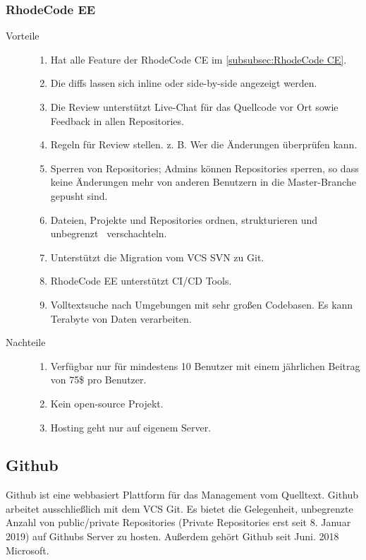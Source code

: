 \subsubsection{RhodeCode EE}
\label{subsubsec:RhodeCode EE}

\begin{description}
	\item [Vorteile] \hfill
		\begin{enumerate}
			\item Hat alle Feature der RhodeCode CE im \cref{subsubsec:RhodeCode CE}.
			\item Die diffs lassen sich inline oder side-by-side angezeigt werden. 
			\item Die Review unterstützt Live-Chat für das Quellcode vor Ort sowie Feedback in allen Repositories.
			\item Regeln für Review stellen. z. B. Wer die Änderungen überprüfen kann.
			\item Sperren von Repositories; Admins können Repositories sperren, so dass keine Änderungen mehr von anderen Benutzern in die Master-Branche gepusht sind.
			\item Dateien, Projekte und Repositories ordnen, strukturieren und unbegrenzt \, verschachteln.
			\item Unterstützt die Migration vom \ac{VCS} \ac{SVN} zu Git.
			\item RhodeCode EE unterstützt \ac{CI}/\ac{CD} Tools.
			\item Volltextsuche nach Umgebungen mit sehr großen Codebasen. Es kann Terabyte von Daten verarbeiten.
		\end{enumerate}
	\item [Nachteile] \hfill
		\begin{enumerate}
			\item Verfügbar nur für mindestens 10 Benutzer mit einem jährlichen Beitrag von 75\$ pro Benutzer.
			\item Kein open-source Projekt.
			\item Hosting geht nur auf eigenem Server.
		\end{enumerate}
\end{description}


\subsection{Github}
\label{Github}

Github ist eine webbasiert Plattform für das Management vom Quelltext. Github arbeitet ausschließlich mit dem \ac{VCS} Git. Es bietet die Gelegenheit, unbegrenzte Anzahl von public/private Repositories (Private Repositories erst seit 8. Januar 2019) auf Githubs Server zu hosten. Außerdem gehört Github seit Juni. 2018 Microsoft.

